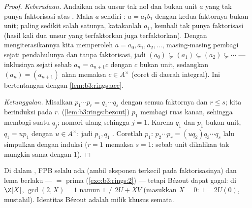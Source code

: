 \begin{proof}
\emph{Keberadaan.} Andaikan ada unsur tak nol dan bukan unit $a$ yang tak punya
faktorisasi atas . Maka $a$ sendiri : $a =
a_1b_1$ dengan kedua faktornya bukan unit; paling sedikit salah satunya, katakanlah
$a_1$, kembali tak punya faktorisasi (hasil kali dua unsur yang terfaktorkan
juga terfaktorkan). Dengan mengiterasikannya kita memperoleh $a = a_0, a_1, a_2,
\dots$, masing-masing pembagi sejati pendahulunya dan tanpa faktorisasi,
jadi $(a_0) \subsetneq (a_1) \subsetneq (a_2) \subsetneq \cdots$
--- inklusinya sejati sebab $a_n = a_{n+1}c$ dengan $c$ bukan
unit, sedangkan $(a_n) = (a_{n+1})$ akan memaksa $c \in A^\times$
(coret di daerah integral). Ini bertentangan dengan \cref{lem:b3:rings:acc}.

\emph{Ketunggalan.} Misalkan $p_1 \cdots p_r = q_1 \cdots q_s$ dengan semua
faktornya  dan $r \leq s$; kita berinduksi pada $r$. 
(\cref{lem:b3:rings:bezout}) $p_1$ membagi ruas kanan, sehingga
membagi suatu $q_j$; nomori ulang sehingga $j = 1$. Karena $q_1$  dan
$p_1$ bukan unit, $q_1 = u p_1$ dengan $u \in A^\times$: jadi $p_1, q_1$
. Coretlah $p_1$: $p_2 \cdots p_r = (u q_2)
q_3\cdots q_s$ lalu simpulkan dengan induksi ($r = 1$ memaksa $s = 1$:
sebab unit dikalikan  tak mungkin sama dengan $1$).
\end{proof}

\begin{remark}\label{rem:b3:rings:ufdgcd}
Di dalam , FPB selalu ada (ambil eksponen terkecil pada
faktorisasinya) dan lema  berlaku ---  $=$ prima
(\cref{exo:b3:rings:2}) --- tetapi Bézout dapat gagal: di $\Z[X]$,
$\gcd(2, X) = 1$ namun $1 \neq 2U + XV$ (masukkan $X = 0$:
$1 = 2U(0)$, mustahil). Identitas Bézout adalah milik khusus
 semata.
\end{remark}

